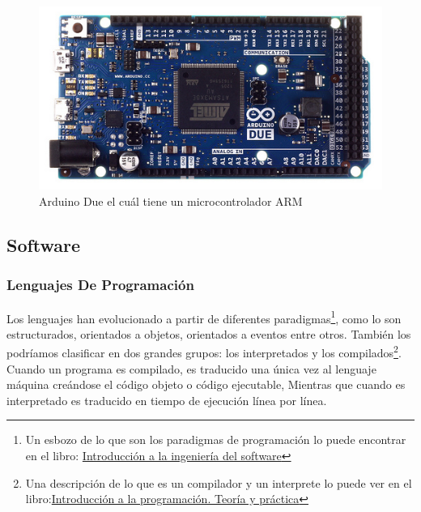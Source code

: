 \documentclass{article}
\begin{document}
\begin{figure}[hptp]
    \centering
    \includegraphics[scale=0.7]{imag/arduino.jpg}
    \caption{Arduino Due el cuál tiene un microcontrolador ARM}
    \label{fig:arduino}
\end{figure}
\smallskip


\subsection{Software}

\subsubsection{Lenguajes De Programación}

Los lenguajes han evolucionado a partir de diferentes paradigmas\footnote{
Un esbozo de lo que son los paradigmas de programación lo puede encontrar
en el libro: \href{https://books.google.com.co/books?id=rXU-WS4UatYC\&lpg=PR4\&dq=paradigmas\%20de\%20programacion\&pg=PA3\#v=onepage\&q\&f=false}
{Introducción a la ingeniería del software}}, 
como lo son estructurados, orientados a objetos, orientados a eventos 
entre otros. También los podríamos clasificar en dos grandes grupos:
los interpretados y los compilados\footnote{Una descripción de lo que
		es un compilador y un interprete lo puede ver en el libro:\href{https://books.google.com.co/books?id=nLMJsInMyBwC\&pg=PA8\&dq=compilador+e+interprete\&hl=es-419\&sa=X\&ved=0ahUKEwjy06Dj3NLLAhVFSiYKHblmCvkQ6AEIIDAB\#v=onepage\&q=compilador\%20e\%20interprete\&f=false}{Introducción a la programación. Teoría y práctica}}. 
Cuando un programa es compilado, es traducido una única vez al lenguaje 
máquina creándose el código objeto o código ejecutable, Mientras que cuando
es interpretado es traducido en tiempo de ejecución línea por línea.
\end{document}
